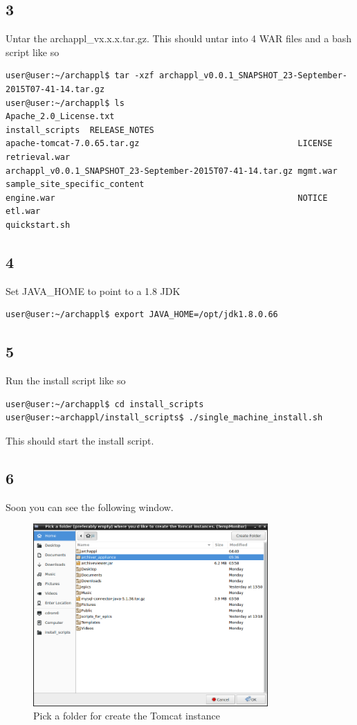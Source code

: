 \documentclass[11pt
  , a4paper
  , article
  , oneside
]{memoir}
\begin{document}
\subsection{3}
Untar the archappl\_vx.x.x.tar.gz. This should untar into 4 WAR files and a bash script like so
\begin{lstlisting}[style=termstyle]
user@user:~/archappl$ tar -xzf archappl_v0.0.1_SNAPSHOT_23-September-2015T07-41-14.tar.gz
user@user:~/archappl$ ls
Apache_2.0_License.txt                                     install_scripts  RELEASE_NOTES
apache-tomcat-7.0.65.tar.gz                                LICENSE          retrieval.war
archappl_v0.0.1_SNAPSHOT_23-September-2015T07-41-14.tar.gz mgmt.war
sample_site_specific_content
engine.war                                                 NOTICE
etl.war                                                    quickstart.sh
\end{lstlisting}
\subsection{4}
Set JAVA\_HOME to point to a 1.8 JDK
\begin{lstlisting}[style=termstyle]
user@user:~/archappl$ export JAVA_HOME=/opt/jdk1.8.0.66
\end{lstlisting}
\subsection{5}
Run the install script like so
\begin{lstlisting}[style=termstyle]
user@user:~/archappl$ cd install_scripts
user@user:~archappl/install_scripts$ ./single_machine_install.sh
\end{lstlisting}
This should start the install script.
\clearpage
\subsection{6}
Soon you can see the following window.

\begin{figure}[h!]
	\centering
	\includegraphics[width=0.8\textwidth, height=0.4\textwidth]{./images/1.png}
	\caption{Pick a folder for create the Tomcat instance}
\end{figure}
\end{document}
